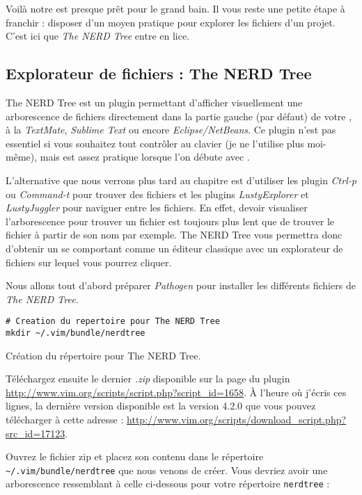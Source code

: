 Voilà notre \vim est presque prêt pour le grand bain. Il vous reste une petite étape à franchir : disposer d'un moyen pratique pour explorer les fichiers d'un projet. C'est ici que \emph{The NERD Tree} entre en lice.

\subsection{Explorateur de fichiers : The NERD Tree}
\label{ssec:nerdtree}
The NERD Tree est un plugin permettant d'afficher visuellement une arborescence de fichiers directement dans la partie gauche (par défaut) de votre \vim, à la \emph{TextMate}, \emph{Sublime Text} ou encore \emph{Eclipse/NetBeans}. Ce plugin n'est pas essentiel si vous souhaitez tout contrôler au clavier (je ne l'utilise plus moi-même), mais est assez pratique lorsque l'on débute avec \vim.

L'alternative que nous verrons plus tard au chapitre  est d'utiliser les plugin \emph{Ctrl-p} ou \emph{Command-t} pour trouver des fichiers et les plugins \emph{LustyExplorer} et \emph{LustyJuggler} pour naviguer entre les fichiers. En effet, devoir visualiser l'arborescence pour trouver un fichier est toujours plus lent que de trouver le fichier à partir de son nom par exemple. The NERD Tree vous permettra donc d'obtenir un \vim se comportant comme un éditeur classique avec un explorateur de fichiers sur lequel vous pourrez cliquer.

Nous allons tout d'abord préparer \emph{Pathogen} pour installer les différents fichiers de \emph{The NERD Tree}.

\begin{listing}[H]
\begin{verbatim}
# Creation du repertoire pour The NERD Tree
mkdir ~/.vim/bundle/nerdtree
\end{verbatim}
  \caption{Création du répertoire pour The NERD Tree.}
  \label{code:nerdtree-bundle}
\end{listing}

Téléchargez ensuite le dernier \emph{.zip} disponible sur la page du plugin \url{http://www.vim.org/scripts/script.php?script_id=1658}. À l'heure où j'écris ces lignes, la dernière version disponible est la version 4.2.0 que vous pouvez télécharger à cette adresse : \url{http://www.vim.org/scripts/download_script.php?src_id=17123}.

Ouvrez le fichier zip et placez son contenu dans le répertoire \Verb|~/.vim/bundle/nerdtree| que nous venons de créer. Vous devriez avoir une arborescence ressemblant à celle ci-dessous pour votre répertoire \Verb|nerdtree| :

